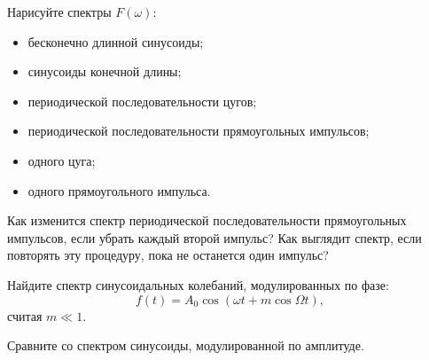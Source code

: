 \begin{lab:questions}

\item Нарисуйте спектры $F(\omega)$:
\begin{itemize}
	\item бесконечно длинной синусоиды;
	\item синусоиды конечной длины;
	\item периодической последовательности цугов;
	\item периодической последовательности прямоугольных импульсов;
	\item одного цуга;
	\item одного прямоугольного импульса.
\end{itemize}
\item Как изменится спектр периодической последовательности прямоугольных импульсов, если убрать каждый второй импульс? Как
выглядит спектр, если повторять эту процедуру, пока не останется один импульс?


\item Найдите спектр синусоидальных колебаний, модулированных по фазе:
\begin{equation*}
	f(t)=A_0\cos(\omega t + m \cos \Omega t),
\end{equation*}
%
считая $m\ll 1$.

Сравните со спектром синусоиды, модулированной по амплитуде.

\end{lab:questions}




